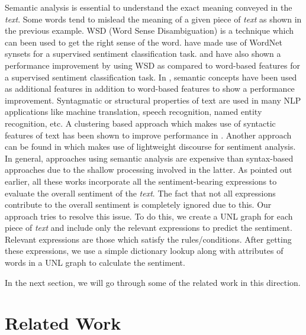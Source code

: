Semantic analysis is essential to understand the exact meaning conveyed in the \textit{text}. Some words tend to mislead the meaning of a given piece of \textit{text} as
shown in the previous example. WSD (Word Sense Disambiguation) is a technique which can been used to get the right sense of the word. \citep*{balamurali2011harnessing} have 
made use of WordNet synsets for a supervised sentiment classification task. \citep*{martin2010word} and \citep*{rentoumi2009sentiment} have also shown a performance improvement 
by using WSD as compared to word-based features for a supervised sentiment classification task. In \citep*{saif2012semantic}, semantic concepts have been used as additional 
features in addition to word-based features to show a performance improvement. Syntagmatic or structural properties of text are used in many NLP applications like machine 
translation, speech recognition, named entity recognition, etc. A clustering based approach which makes use of syntactic features of text has been shown to improve performance 
in \citep*{arhaves}. Another approach can be found in \citep*{mukherjee2012sentiment} which makes use of lightweight discourse for sentiment analysis. In general, approaches 
using semantic analysis are expensive than syntax-based approaches due to the shallow processing involved in the latter. As pointed out earlier, all these works incorporate all 
the sentiment-bearing expressions to evaluate the overall sentiment of the \textit{text}. The fact that not all expressions contribute to the overall sentiment is completely 
ignored due to this. Our approach tries to resolve this issue. To do this, we create a UNL graph for each piece of \textit{text} and include only the relevant expressions to 
predict the sentiment. Relevant expressions are those which satisfy the rules/conditions. After getting these expressions, we use a simple dictionary lookup along with attributes
of words in a UNL graph to calculate the sentiment.

In the next section, we will go through some of the related work in this direction.

\section{Related Work}

